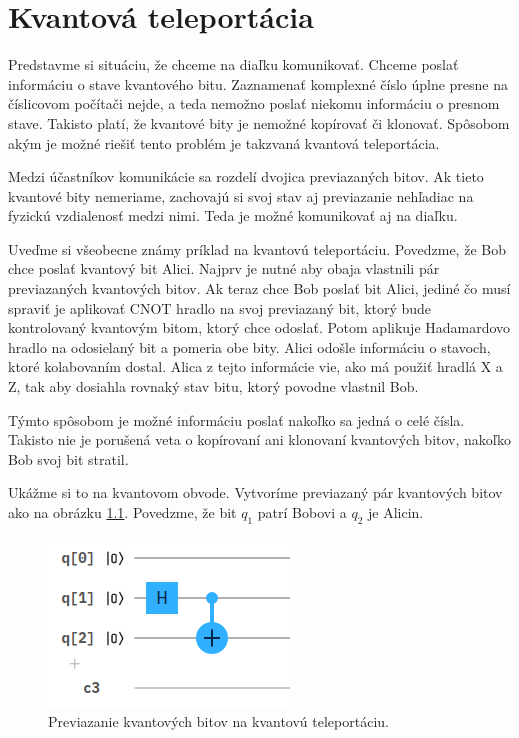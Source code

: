 
\chapter{Kvantová teleportácia}

Predstavme si situáciu, že chceme na diaľku komunikovať. Chceme poslať
informáciu o stave kvantového bitu. Zaznamenať komplexné číslo úplne presne 
na číslicovom počítači nejde, a teda nemožno poslať niekomu informáciu o 
presnom stave. Takisto platí, že kvantové bity je nemožné kopírovať či
klonovať. Spôsobom akým je možné riešiť tento problém je takzvaná kvantová
teleportácia.

Medzi účastníkov komunikácie sa rozdelí dvojica previazaných bitov. Ak tieto
kvantové bity nemeriame, zachovajú si svoj stav aj previazanie nehľadiac
na fyzickú vzdialenosť medzi nimi. Teda je možné komunikovať aj na diaľku.

Uveďme si všeobecne známy príklad na kvantovú teleportáciu. Povedzme, že 
Bob chce poslať kvantový bit Alici. Najprv je nutné aby obaja vlastnili
pár previazaných kvantových bitov. Ak teraz chce Bob poslať bit Alici, jediné
čo musí spraviť je aplikovať CNOT hradlo na svoj previazaný bit, ktorý bude 
kontrolovaný kvantovým bitom, ktorý chce odoslať. Potom aplikuje Hadamardovo
hradlo na odosielaný bit a pomeria obe bity. Alici odošle informáciu o
stavoch, ktoré kolabovaním dostal. Alica z tejto informácie vie, ako má použiť
hradlá X a Z, tak aby dosiahla rovnaký stav bitu, ktorý povodne vlastnil Bob.

Týmto spôsobom je možné informáciu poslať nakoľko sa jedná o celé čísla.
Takisto nie je porušená veta o kopírovaní ani klonovaní kvantových bitov, 
nakoľko Bob svoj bit stratil.

Ukážme si to na kvantovom obvode. Vytvoríme previazaný pár kvantových bitov
ako na obrázku \ref{tel_c1}. Povedzme, že bit \(q_1\) patrí Bobovi a \(q_2\)
je Alicin.

\begin{figure} 
	\centering 
	\includegraphics[width=.5\textwidth]{figures/tel_c1.png} 
	\caption{Previazanie kvantových bitov na kvantovú teleportáciu.}
    \label{tel_c1}
\end{figure}

